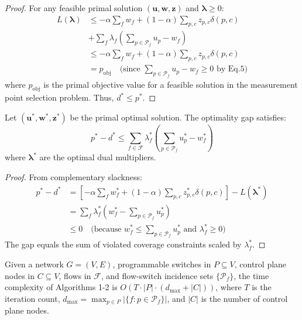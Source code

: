 \begin{proof}
For any feasible primal solution \((\mathbf{u},\mathbf{w},\mathbf{z})\) and \(\boldsymbol{\lambda} \geq 0\):
\[
\begin{aligned}
L(\boldsymbol{\lambda}) &\leq -\alpha \sum_f w_f + (1-\alpha) \sum_{p,c} z_{p,c} \delta(p,c) \\
&+ \sum_f \lambda_f \left( \sum_{p \in \mathcal{P}_f} u_p - w_f \right) \\
&\leq -\alpha \sum_f w_f + (1-\alpha) \sum_{p,c} z_{p,c} \delta(p,c) \\
&= p_{\text{obj}} \quad \text{(since } \sum_{p \in \mathcal{P}_f} u_p - w_f \geq 0 \text{ by Eq.5)}
\end{aligned}
\]
where $p_{\text{obj}}$ is the primal objective value for a feasible solution in the measurement point selection problem. Thus, \(d^* \leq p^*\).
\end{proof}

\begin{theorem}
Let \((\mathbf{u}^*,\mathbf{w}^*,\mathbf{z}^*)\) be the primal optimal solution. The optimality gap satisfies:
\[
p^* - d^* \leq \sum_{f \in \mathcal{F}} \lambda_f^* \left( \sum_{p \in \mathcal{P}_f} u_p^* - w_f^* \right)
\]
where \(\boldsymbol{\lambda}^*\) are the optimal dual multipliers.
\end{theorem}

\begin{proof}
From complementary slackness:
\[
\begin{aligned}
p^* - d^* &= \left[ -\alpha \sum_f w_f^* + (1-\alpha) \sum_{p,c} z_{p,c}^* \delta(p,c) \right] - L(\boldsymbol{\lambda}^*) \\
&= \sum_f \lambda_f^* \left( w_f^* - \sum_{p \in \mathcal{P}_f} u_p^* \right) \\
&\leq 0 \quad \text{(because } w_f^* \leq \sum_{p \in \mathcal{P}_f} u_p^* \text{ and } \lambda_f^* \geq 0\text{)}
\end{aligned}
\]
The gap equals the sum of violated coverage constraints scaled by \(\lambda_f^*\).
\end{proof}

\begin{theorem}
Given a network $G = (V, E)$, programmable switches in $P \subseteq V$, control plane nodes in $C \subseteq V$, flows in $\mathcal{F}$, and flow-switch incidence sets $\{\mathcal{P}_f\}$, the time complexity of Algorithms 1-2 is $O(T \cdot |P| \cdot (d_{\max} + |C|))$, where $T$ is the iteration count, $d_{\max} = \max_{p \in P} |\{f : p \in \mathcal{P}_f\}|$, and $|C|$ is the number of control plane nodes.
\end{theorem}

